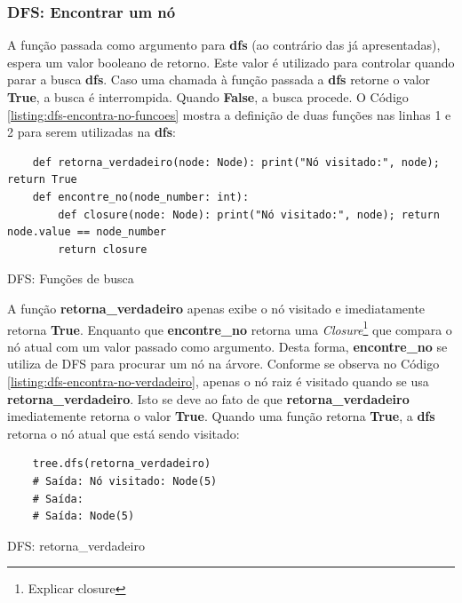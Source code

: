 \subsubsection{DFS: Encontrar um nó}

A função passada como argumento para \textbf{dfs} (ao contrário das já apresentadas), espera um valor booleano de retorno.
Este valor é utilizado para controlar quando parar a busca \textbf{dfs}. Caso uma chamada à função passada a \textbf{dfs}
retorne o valor \textbf{True}, a busca é interrompida. Quando \textbf{False}, a busca procede.\linebreak
O Código \ref{listing:dfs-encontra-no-funcoes} mostra a definição de duas funções nas linhas 1 e 2 para serem
utilizadas na \textbf{dfs}:

\begin{listing}[H]
    \begin{verbatim}
    def retorna_verdadeiro(node: Node): print("Nó visitado:", node); return True
    def encontre_no(node_number: int):
        def closure(node: Node): print("Nó visitado:", node); return node.value == node_number
        return closure
    \end{verbatim}
    \caption{DFS: Funções de busca}
    \label{listing:dfs-encontra-no-funcoes}
\end{listing}
A função \textbf{retorna\_verdadeiro} apenas exibe o nó visitado e imediatamente retorna \textbf{True}. Enquanto que \textbf{encontre\_no}
retorna uma \textit{Closure}\footnote{
    Explicar closure
}
que compara o nó atual com um valor passado como argumento. Desta forma, \textbf{encontre\_no} se utiliza de DFS para procurar um nó na árvore.\linebreak
Conforme se observa no Código \ref{listing:dfs-encontra-no-verdadeiro}, apenas o nó raiz é visitado quando se usa \textbf{retorna\_verdadeiro}. Isto se deve ao fato de que \textbf{retorna\_verdadeiro} imediatemente retorna
o valor \textbf{True}. Quando uma função retorna \textbf{True}, a \textbf{dfs} retorna o nó atual que está sendo visitado:

\begin{listing}[H]
    \begin{verbatim}
    tree.dfs(retorna_verdadeiro)
    # Saída: Nó visitado: Node(5)
    # Saída: 
    # Saída: Node(5)
    \end{verbatim}
    \caption{DFS: retorna\_verdadeiro}
    \label{listing:dfs-encontra-no-verdadeiro}
\end{listing}

